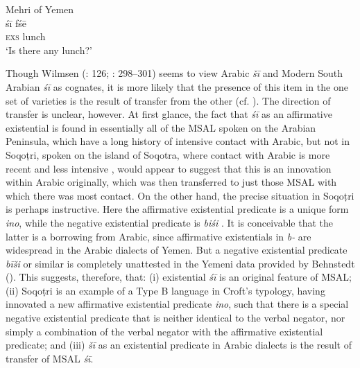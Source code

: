 \documentclass[output=paper]{langsci/langscibook}
\begin{document}
\ea\label{meh}
{       Mehri of Yemen \citep[31]{Watson2011SAYemeni}}\\
\gll śī fśē \\
     \textsc{exs} lunch\\
\glt ‘Is there any lunch?’
\z

Though Wilmsen (\citeyear{Wilmsen2014}: 126; \citeyear{Wilmsen2017}: 298--301) seems to view Arabic \textit{šī} and Modern South Arabian \textit{śī} as cognates, it is more likely that the presence of this item in the one set of varieties is the result of transfer from the other (cf. \citealt{Al-Jallad2015review}). The direction of transfer is unclear, however. At first glance, the fact that \textit{śī} as an affirmative existential is found in essentially all of the MSAL spoken on the Arabian Peninsula, which have a long history of intensive contact with Arabic, but not in Soqoṭri, spoken on the island of Soqotra, where contact with Arabic is more recent and less intensive \citep{Simeone-Senelle2003}, would appear to suggest that this is an innovation within Arabic originally, which was then transferred to just those MSAL with which there was most contact. On the other hand, the precise situation in Soqoṭri is perhaps instructive. Here the affirmative existential predicate is a unique form \textit{ino}, while the negative existential predicate is \textit{biśi} \citep[1108]{Simeone-Senelle2011}. It is conceivable that the latter is a borrowing from Arabic, since affirmative existentials in \textit{b-} are widespread in the Arabic dialects of Yemen. But a negative existential predicate \textit{bīši} or similar is completely unattested in the Yemeni data provided by Behnstedt (\citeyear[346–348]{Behnstedt2016Yemen}). This suggests, therefore, that: (i) existential \textit{śī} is an original feature of MSAL; (ii) Soqoṭri is an example of a Type B language in Croft’s typology, having innovated a new affirmative existential predicate \textit{ino}, such that there is a special negative existential predicate that is neither identical to the verbal negator, nor simply a combination of the verbal negator with the affirmative existential predicate; and (iii) \textit{šī} as an existential predicate in Arabic dialects is the result of transfer of MSAL \textit{śī}. 
\end{document}
